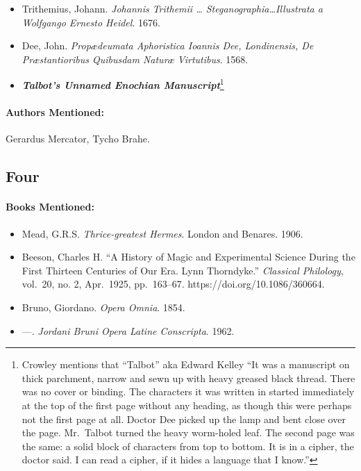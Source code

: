 \documentclass[12pt]{article}
\providecommand{\tightlist}{%
  \setlength{\itemsep}{0pt}\setlength{\parskip}{0pt}}
\begin{document}
\begin{itemize}
\tightlist
\item
  Trithemius, Johann. \emph{Johannis Trithemii \ldots{} Steganographia\ldots Illustrata a Wolfgango Ernesto Heidel}. 1676.
\item
  Dee, John. \emph{Propædeumata Aphoristica Ioannis Dee, Londinensis, De Præstantioribus Quibusdam Naturæ Virtutibus}. 1568.
\item
  \textbf{\emph{Talbot's Unnamed Enochian Manuscript}}\footnote{Crowley mentions that ``Talbot'' aka Edward Kelley ``It was a manuscript on thick parchment, narrow and sewn up with heavy greased black thread. There was no cover or binding. The characters it was written in started immediately at the top of the first page without any heading, as though this were perhaps not the first page at all. Doctor Dee picked up the lamp and bent close over the page. Mr.~Talbot turned the heavy worm-holed leaf. The second page was the same: a solid block of characters from top to bottom. It is in a cipher, the doctor said. I can read a cipher, if it hides a language that I know.''}
\end{itemize}

\paragraph{Authors Mentioned:}\label{authors-mentioned-7}

Gerardus Mercator, Tycho Brahe.

\subsection{Four}\label{four-1}

\paragraph{Books Mentioned:}\label{books-mentioned-11}

\begin{itemize}
\tightlist
\item
  Mead, G.R.S. \emph{Thrice-greatest Hermes}. London and Benares. 1906.
\item
  Beeson, Charles H. ``A History of Magic and Experimental Science During the First Thirteen Centuries of Our Era. Lynn Thorndyke.'' \emph{Classical Philology}, vol.~20, no. 2, Apr.~1925, pp.~163--67. https://doi.org/10.1086/360664.
\item
  Bruno, Giordano. \emph{Opera Omnia}. 1854.
\item
  ---. \emph{Jordani Bruni Opera Latine Conscripta}. 1962.
\end{itemize}
\end{document}
